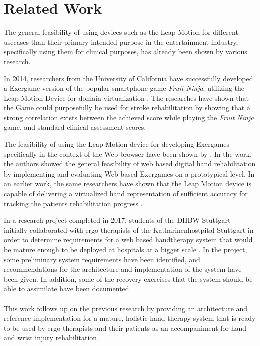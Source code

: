 \chapter{Related Work}
\label{sec:relatedwork}

The general feasibility of using devices such as the Leap Motion for different usecases than their primary intended purpose in the entertainment industry, specifically using them for clinical purposes, has already been shown by various research.

In 2014, researchers from the University of California have successfully developed a Exergame version of the popular smartphone game \emph{Fruit Ninja}, utilizing the Leap Motion Device for domain virtualization \cite{khademi2014free}. The researches have shown that the Game could purposefully be used for stroke rehabilitation by showing that a strong correlation exists between the achieved score while playing the \emph{Fruit Ninja} game, and standard clinical assessment scores.

The feasibility of using the Leap Motion device for developing Exergames specifically in the context of the Web browser have been shown by \cite{DigitizingHandRehabilitation}. In the work, the authors showed the general feasibility of web based digital hand rehabilitation by implementing and evaluating Web based Exergames on a prototypical level. In an earlier work, the same researchers have shown that the Leap Motion device is capable of delivering a virtualized hand representation of sufficient accuracy for tracking the patients rehabilitation progress \cite{AnalyzingHandTherapySuccess}.

In a research project completed in 2017, students of the DHBW Stuttgart initially collaborated with ergo therapists of the Katharinenhostpital Stuttgart in order to determine requirements for a web based handtherapy system that would be mature enough to be deployed at hospitals at a bigger scale \cite{StudiArbeitVolzBaumotte}. In the project, some preliminary system requirements have been identified, and recommendations for the architecture and implementation of the system have been given. In addition, some of the recovery exercises that the system should be able to assimilate have been documented.
\\\\
This work follows up on the previous research by providing an architecture and reference implementation for a mature, holistic hand therapy system that is ready to be used by ergo therapists and their patients as an accompaniment for hand and wrist injury rehabilitation.